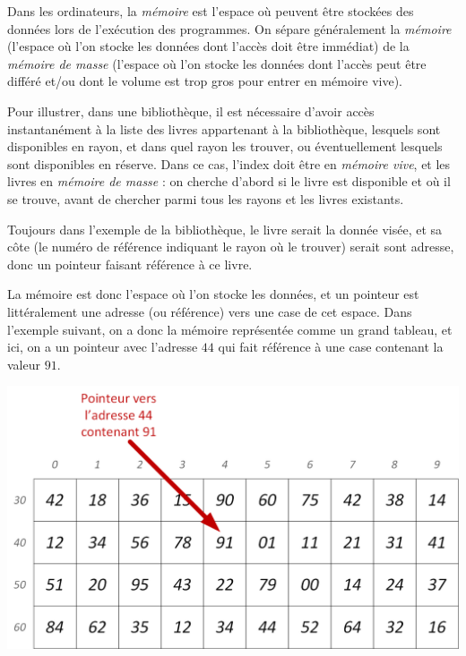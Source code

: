 \documentclass[11pt,a4paper]{article}
\begin{document}
\pagebreak


Dans les ordinateurs, la \textit{mémoire} est l'espace où peuvent être stockées des données lors de l'exécution des programmes.
On sépare généralement la \textit{mémoire} (l'espace où l'on stocke les données dont l'accès doit être immédiat) de la \textit{mémoire de masse} (l'espace où l'on stocke les données dont l'accès peut être différé et/ou dont le volume est trop gros pour entrer en mémoire vive).

Pour illustrer, dans une bibliothèque, il est nécessaire d'avoir accès instantanément à la liste des livres appartenant à la bibliothèque, lesquels sont disponibles en rayon, et dans quel rayon les trouver, ou éventuellement lesquels sont disponibles en réserve.
Dans ce cas, l'index doit être en \textit{mémoire vive}, et les livres en \textit{mémoire de masse} : on cherche d'abord si le livre est disponible et où il se trouve, avant de chercher parmi tous les rayons et les livres existants.

Toujours dans l'exemple de la bibliothèque, le livre serait la donnée visée, et sa côte (le numéro de référence indiquant le rayon où le trouver) serait sont adresse, donc un pointeur faisant référence à ce livre.

\bigskip

La mémoire est donc l'espace où l'on stocke les données, et un pointeur est littéralement une adresse (ou référence) vers une case de cet espace.
Dans l'exemple suivant, on a donc la mémoire représentée comme un grand tableau, et ici, on a un pointeur avec l'adresse $ 44 $ qui fait référence à une case contenant la valeur $ 91 $.

\bigskip

\begin{center}
\includegraphics[scale=0.75]{img/pointeurs/memoire_pointeur.png}
\end{center}
\end{document}
